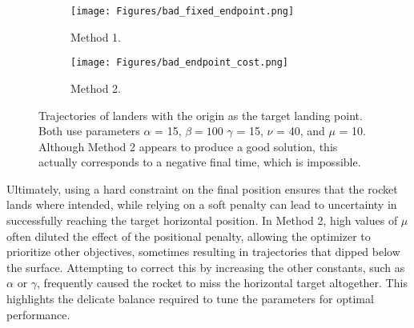 \documentclass{article}
\begin{document}
\begin{figure}[h]
    \centering
    \begin{subfigure}{0.45\textwidth}
        \centering
        \texttt{[image: Figures/bad\_fixed\_endpoint.png]}
        \caption{Method 1.}
        \label{fig:Cost Unsuccessful}
    \end{subfigure}
    \hfill
    \begin{subfigure}{0.45\textwidth}
        \centering
        \texttt{[image: Figures/bad\_endpoint\_cost.png]}
        \caption{Method 2.}
        \label{fig:Condition 2}
    \end{subfigure}
    \caption{Trajectories of landers with the origin as the target landing point. Both use parameters $\alpha$ = 15, $\beta = 100$ $\gamma$ = 15, $\nu$ = 40, and $\mu$ = 10. Although Method 2 appears to produce a good solution, this actually corresponds to a negative final time, which is impossible.}
    \label{fig:regular}
\end{figure}

Ultimately, using a hard constraint on the final position ensures that the rocket lands where intended, while relying on a soft penalty can lead to uncertainty in successfully reaching the target horizontal position. In Method 2, high values of $\mu$ often diluted the effect of the positional penalty, allowing the optimizer to prioritize other objectives, sometimes resulting in trajectories that dipped below the surface. Attempting to correct this by increasing the other constants, such as $\alpha$ or $\gamma$, frequently caused the rocket to miss the horizontal target altogether. This highlights the delicate balance required to tune the parameters for optimal performance.
\pagebreak
\end{document}
